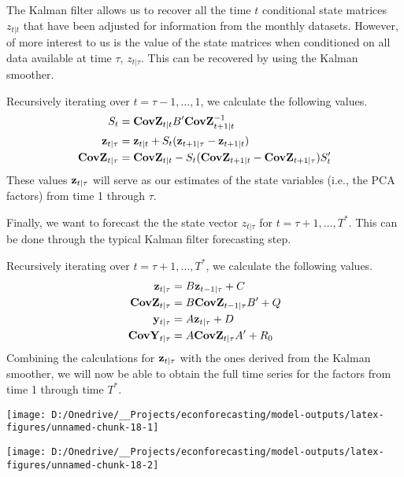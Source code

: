 \documentclass[11pt, letterpaper]{article}\usepackage[]{graphicx}\usepackage[]{color}
\newcommand{\vv}[1]{\textcolor{black}{\mathbf{#1}}}
\begin{document}
The Kalman filter allows us to recover all the time $t$ conditional state matrices $z_{t|t}$ that have been adjusted for information from the monthly datasets. However, of more interest to us is the value of the state matrices when conditioned on all data available at time $\tau$, $z_{t|\tau}$. This can be recovered by using the Kalman smoother.

Recursively iterating over $t = \tau - 1, \dots, 1$, we calculate the following values. 
\begin{align*}
	S_{t} &= \vv{CovZ}_{t|t} B' \vv{CovZ}^{-1}_{t + 1|t}\\
	\vv{z}_{t|\tau} &= \vv{z}_{t|t} + S_t (\vv{z}_{t+1|\tau} - \vv{z}_{t + 1|t})\\
	\vv{CovZ}_{t|\tau} &= \vv{CovZ}_{t|t} - S_t(\vv{CovZ}_{t + 1|t} - \vv{CovZ}_{t + 1|\tau})S'_t
\end{align*}
These values $\vv{z}_{t|\tau}$ will serve as our estimates of the state variables (i.e., the PCA factors) from time 1 through $\tau$.

Finally, we want to forecast the the state vector $z_{t|\tau}$ for $t = \tau + 1, \dots, T^*$. This can be done through the typical Kalman filter forecasting step.

Recursively iterating over $t = \tau + 1, \dots, T^*$, we calculate the following values.
\begin{align*}
	\vv{z}_{t|\tau} &= B \vv{z}_{t-1|\tau} + C\\
	\vv{CovZ}_{t|\tau} &= B \vv{CovZ}_{t-1|\tau} B'+ Q\\
	\vv{y}_{t|\tau} &= A \vv{z}_{t|\tau} + D\\
	\vv{CovY}_{t|\tau} &= A \vv{CovZ}_{t|\tau} A' + R_0
\end{align*}
Combining the calculations for $\vv{z}_{t|\tau}$ with the ones derived from the Kalman smoother, we will now be able to obtain the full time series for the factors from time 1 through time $T^*$.



{\centering \texttt{[image: D:/Onedrive/\_\_Projects/econforecasting/model-outputs/latex-figures/unnamed-chunk-18-1]} 

}




{\centering \texttt{[image: D:/Onedrive/\_\_Projects/econforecasting/model-outputs/latex-figures/unnamed-chunk-18-2]} 

}
\end{document}
